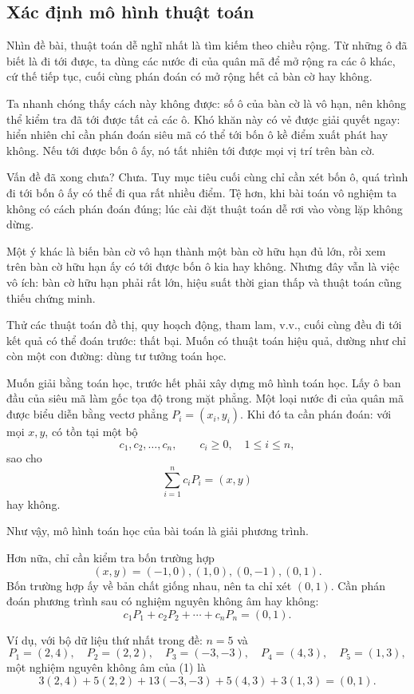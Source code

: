 \documentclass[11pt]{article}
\begin{document}
\subsection{Xác định mô hình thuật toán}

Nhìn đề bài, thuật toán dễ nghĩ nhất là tìm kiếm theo chiều rộng. Từ những ô
đã biết là đi tới được, ta dùng các nước đi của quân mã để mở rộng ra các ô
khác, cứ thế tiếp tục, cuối cùng phán đoán có mở rộng hết cả bàn cờ hay
không.

Ta nhanh chóng thấy cách này không được: số ô của bàn cờ là vô hạn, nên không
thể kiểm tra đã tới được tất cả các ô. Khó khăn này có vẻ được giải quyết
ngay: hiển nhiên chỉ cần phán đoán siêu mã có thể tới bốn ô kề điểm xuất phát
hay không. Nếu tới được bốn ô ấy, nó tất nhiên tới được mọi vị trí trên bàn cờ.

Vấn đề đã xong chưa? Chưa. Tuy mục tiêu cuối cùng chỉ cần xét bốn ô, quá trình
đi tới bốn ô ấy có thể đi qua rất nhiều điểm. Tệ hơn, khi bài toán vô nghiệm
ta không có cách phán đoán đúng; lúc cài đặt thuật toán dễ rơi vào vòng lặp
không dừng.

Một ý khác là biến bàn cờ vô hạn thành một bàn cờ hữu hạn đủ lớn, rồi xem trên
bàn cờ hữu hạn ấy có tới được bốn ô kia hay không. Nhưng đây vẫn là việc vô
ích: bàn cờ hữu hạn phải rất lớn, hiệu suất thời gian thấp và thuật toán cũng
thiếu chứng minh.

Thử các thuật toán đồ thị, quy hoạch động, tham lam, v.v., cuối cùng đều đi
tới kết quả có thể đoán trước: thất bại. Muốn có thuật toán hiệu quả, dường
như chỉ còn một con đường: dùng tư tưởng toán học.

Muốn giải bằng toán học, trước hết phải xây dựng mô hình toán học. Lấy ô ban
đầu của siêu mã làm gốc tọa độ trong mặt phẳng. Một loại nước đi của quân mã
được biểu diễn bằng vectơ phẳng \(P_i=(x_i,y_i)\). Khi đó ta cần phán đoán:
với mọi \(x,y\), có tồn tại một bộ
\[
  c_1,c_2,\ldots,c_n,\qquad c_i\ge 0,\quad 1\le i\le n,
\]
sao cho
\[
  \sum_{i=1}^{n} c_iP_i=(x,y)
\]
hay không.

Như vậy, mô hình toán học của bài toán là giải phương trình.

Hơn nữa, chỉ cần kiểm tra bốn trường hợp
\[
  (x,y)=(-1,0),(1,0),(0,-1),(0,1).
\]
Bốn trường hợp ấy về bản chất giống nhau, nên ta chỉ xét \((0,1)\). Cần phán
đoán phương trình sau có nghiệm nguyên không âm hay không:
\[
  c_1P_1+c_2P_2+\cdots+c_nP_n=(0,1). \tag{1}
\]

Ví dụ, với bộ dữ liệu thứ nhất trong đề: \(n=5\) và
\[
P_1=(2,4),\quad P_2=(2,2),\quad P_3=(-3,-3),\quad
P_4=(4,3),\quad P_5=(1,3),
\]
một nghiệm nguyên không âm của (1) là
\[
  3(2,4)+5(2,2)+13(-3,-3)+5(4,3)+3(1,3)=(0,1).
\]
\end{document}
